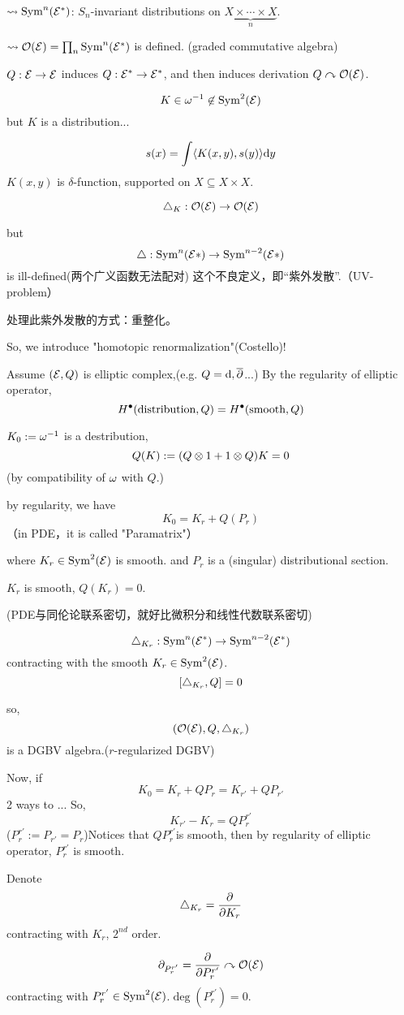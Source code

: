 $\rightsquigarrow\operatorname{Sym}^n(\mathcal{E}^*)$: $S_n$-invariant distributions on
$\underbrace{X\times\cdots\times X}_n$.

$\rightsquigarrow\mathcal{O}(\mathcal{E})=\prod_n\operatorname{Sym}^n(\mathcal{E}^*)$ is defined.
(graded commutative algebra)

$Q:\mathcal{E}\to\mathcal{E}$ induces $Q:\mathcal{E}^*\to\mathcal{E}^*$, and then
induces derivation $Q\curvearrowright\mathcal{O}(\mathcal{E})$.

$$K\in\omega^{-1}\not\in\operatorname{Sym}^2(\mathcal{E})$$
but $K$ is a distribution...

$$s(x)=\int\langle K(x,y),s(y)\rangle\mathrm{d} y$$
$K(x,y)$ is $\delta$-function, supported on $X\subseteq X\times X$.

$$\triangle_K:\mathcal{O}(\mathcal{E})\to\mathcal{O}(\mathcal{E})$$

but
$$\triangle:\operatorname{Sym}^n(\mathcal{E}*)\to\operatorname{Sym}^{n-2}(\mathcal{E}*)$$
is ill-defined(两个广义函数无法配对)
这个不良定义，即“紫外发散”.（UV-problem）

处理此紫外发散的方式：重整化。

So, we introduce "homotopic renormalization"(Costello)!

Assume $(\mathcal{E},Q)$ is elliptic complex,(e.g. $Q=\mathrm{d},\overline{\partial}$...)
By the regularity of elliptic operator,
$$H^{\bullet}(\text{distribution},Q)=H^{\bullet}(\text{smooth},Q)$$

$K_0:=\omega^{-1}$ is a destribution,
$$Q(K):=(Q\otimes 1+ 1\otimes Q)K=0$$
(by compatibility of $\omega$ with $Q$.)

by regularity, we have
$$K_0=K_r+Q(P_r)$$
（in PDE，it is called "Paramatrix"）

where $K_r\in\operatorname{Sym}^2(\mathcal{E})$ is smooth.
and $P_r$ is a (singular) distributional section.

$K_r$ is smooth, $Q(K_r)=0$.

{\color{blue}
(PDE与同伦论联系密切，就好比微积分和线性代数联系密切)
}

$$\triangle_{K_r}:\operatorname{Sym}^n(\mathcal{E}^*)\to\operatorname{Sym}^{n-2}(\mathcal{E}^*)$$
contracting with the smooth $K_r\in\operatorname{Sym}^2(\mathcal{E})$.
$$[\triangle_{K_r},Q]=0$$

so,
$$(\mathcal{O}(\mathcal{E}),Q,\triangle_{K_r})$$
is a DGBV algebra.($r$-regularized DGBV)

Now, if
$$K_0=K_r+QP_r=K_{r'}+QP_{r'}$$
2 ways to ...
So,
$$K_{r'}-K_r=QP^{r'}_r$$
($P_r^{r'}:=P_{r'}=P_r$)Notices that
$QP^{r'}_r$is smooth, then by regularity of elliptic operator,
$P^{r'}_r$ is smooth.

Denote
$$\triangle_{K_r}=\frac{\partial } {\partial K_r}$$
contracting with $K_r$, $2^{nd}$ order.

$$\partial_{P_r^{r'}}=\frac{\partial } {\partial P_r^{r'}}\curvearrowright\mathcal{O}(\mathcal{E})$$
contracting with $P_r^{r'}\in\operatorname{Sym}^2(\mathcal{E})$.$\deg(P_r^{r'})=0$.

